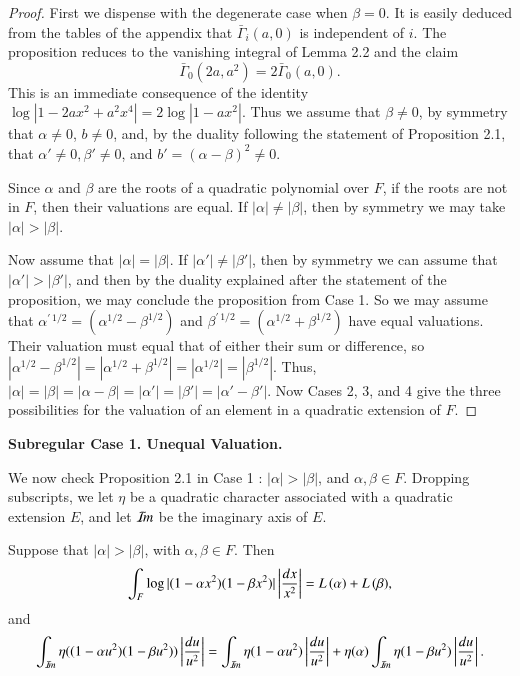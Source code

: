 \documentclass{amsart}
\newcommand\leftd[1]{\left | {d#1\over #1^2}\right |}
\newcommand\leftdx{\leftd x}
\newcommand\leftdu{\leftd u}
\newcommand\Imm{{\mathcal I\hskip-.2em m}}
\newcommand\LOG{{L\,}}
\newcommand\bGamma{\bar\Gamma}
\newenvironment{cthm}[1]
  {\renewcommand\thethm{\bf #1}\thm}
  {\endthm}
\begin{document}
\noindent
\begin{proof}  First we dispense with the degenerate case when $\beta=0$.
It is easily deduced from the tables of the appendix that $\bGamma_i(a,0)$
is independent of $i$.  The proposition reduces to the vanishing integral
of Lemma 2.2 and the claim
$$\bGamma_0(2a,a^2) = 2\bGamma_0(a,0).$$
This is an immediate consequence of the identity
$\log|1-2a x^2+a^2 x^4| = 2\log|1-a x^2|$.
Thus we assume that $\beta\ne0$, by symmetry that $\alpha\ne0$,
$b\ne 0$, and, by the duality following the statement of
Proposition 2.1, that $\alpha'\ne0,\beta'\ne0$, 
and $b'=(\alpha-\beta)^2\ne0$.

Since $\alpha$ and $\beta$ are the roots of a quadratic
polynomial over $F$, if the roots are not in $F$, then their valuations
are equal.  If $|\alpha|\ne |\beta|$, then by symmetry we may take
$|\alpha|>|\beta|$.

Now assume that $|\alpha|=|\beta|$.  If $|\alpha'|\ne |\beta'|$, then
by symmetry we can assume that $|\alpha'|>|\beta'|$, and then by
the duality explained after the 
statement of the proposition, we may conclude the
proposition from Case 1.  So we may assume that 
$\alpha^{\prime\,1/2} = (\alpha^{1/2}-\beta^{1/2})$ and 
$\beta^{\prime\,1/2} = (\alpha^{1/2}+\beta^{1/2})$ have equal valuations.
Their valuation must equal that of either their sum or difference,
so $|\alpha^{1/2}-\beta^{1/2}| = |\alpha^{1/2}+\beta^{1/2}| = |\alpha^{1/2}|
= |\beta^{1/2}|$.  Thus, $|\alpha|=|\beta|=|\alpha-\beta| =
|\alpha'|=|\beta'| = |\alpha'-\beta'|$.   Now Cases 2, 3, and 4 give
the three possibilities for the valuation of an element in a quadratic
extension of $F$.
\end{proof}


\bigskip
\centerline{\bf Subregular Case 1. Unequal Valuation.}
\bigskip

We now check Proposition 2.1 in Case 1 : $|\alpha| >|\beta|$, and $\alpha,
\beta\in F$.  Dropping subscripts, we let $\eta$ be a quadratic character
associated with a quadratic extension $E$, and let $\Imm$ be the
imaginary axis of $E$.

\bigskip
\noindent
\begin{cthm}{Lemma 2.4}  Suppose that $|\alpha|>|\beta|$, with $\alpha,\beta\in F$.
Then
$$\int_{F} \log|(1-\alpha x^2)(1-\beta x^2)| \leftdx
  = \LOG(\alpha) + \LOG(\beta), $$
and
$$\int_{\Imm} \eta((1-\alpha u^2)(1-\beta u^2))\leftdu
  = \int_{\Imm}\eta(1-\alpha u^2) \leftdu +
\eta(\alpha) \int_{\Imm}\eta(1-\beta u^2)\leftdu.$$
\end{cthm}
\end{document}
